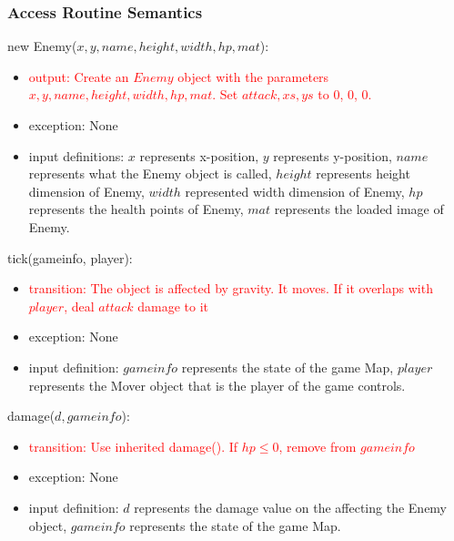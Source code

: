 \documentclass[12pt]{article}
\newcommand{\Implies}{\Rightarrow}
\newcommand{\m}[1]{\mbox{#1}}
\begin{document}
\subsubsection*{Access Routine Semantics}

new Enemy($x, y, name, height, width, hp, mat$):
\begin{itemize}
    \item \textcolor{red}{output: Create an $Enemy$ object with the parameters $x, y, name, height, width, hp, mat$. Set $attack, xs, ys$ to 0, 0, 0.}
    \item exception: None
    \item input definitions: $x$ represents x-position, $y$ represents y-position, $name$ represents what the Enemy object is called, $height$ represents height dimension of Enemy, $width$ represented width dimension of Enemy, $hp$ represents the health points of Enemy, $mat$ represents the loaded image of Enemy.
\end{itemize}

\noindent tick(gameinfo, player):
\begin{itemize}
    \item \textcolor{red}{transition: The object is affected by gravity. It moves. If it overlaps with $player$, deal $attack$ damage to it}
    \item exception: None
    \item input definition: $gameinfo$ represents the state of the game Map, $player$ represents the Mover object that is the player of the game controls.
\end{itemize}

\noindent damage($d, gameinfo$):
\begin{itemize}
    \item \textcolor{red}{transition: Use inherited damage(). If $hp \leq 0$, remove from $gameinfo$}
    \item exception: None
    \item input definition: $d$ represents the damage value on the affecting the Enemy object, $gameinfo$ represents the state of the game Map.
\end{itemize}
\end{document}
